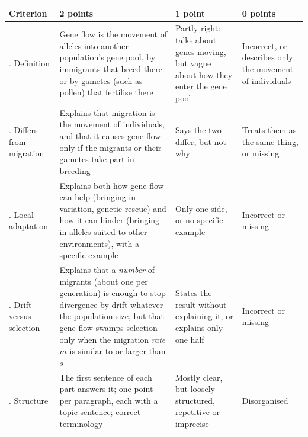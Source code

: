 \documentclass[
  a4paper]{book}
\newcounter{none} %
\begin{document}
{\def\LTcaptype{none} %
\begin{longtable}[]{@{}
  >{\raggedright\arraybackslash}p{}
  >{\raggedright\arraybackslash}p{}
  >{\raggedright\arraybackslash}p{}
  >{\raggedright\arraybackslash}p{}@{}}
\toprule\noalign{}
\begin{minipage}[b]{\linewidth}\raggedright
Criterion
\end{minipage} & \begin{minipage}[b]{\linewidth}\raggedright
2 points
\end{minipage} & \begin{minipage}[b]{\linewidth}\raggedright
1 point
\end{minipage} & \begin{minipage}[b]{\linewidth}\raggedright
0 points
\end{minipage} \\
\midrule\noalign{}
\endhead
\bottomrule\noalign{}
\endlastfoot
1. Definition & Gene flow is the movement of alleles into another population's gene pool, by immigrants that breed there or by gametes (such as pollen) that fertilise there & Partly right: talks about genes moving, but vague about how they enter the gene pool & Incorrect, or describes only the movement of individuals \\
2. Differs from migration & Explains that migration is the movement of individuals, and that it causes gene flow only if the migrants or their gametes take part in breeding & Says the two differ, but not why & Treats them as the same thing, or missing \\
3. Local adaptation & Explains both how gene flow can help (bringing in variation, genetic rescue) and how it can hinder (bringing in alleles suited to other environments), with a specific example & Only one side, or no specific example & Incorrect or missing \\
4. Drift versus selection & Explains that a \emph{number} of migrants (about one per generation) is enough to stop divergence by drift whatever the population size, but that gene flow swamps selection only when the migration \emph{rate} \(m\) is similar to or larger than \(s\) & States the result without explaining it, or explains only one half & Incorrect or missing \\
5. Structure & The first sentence of each part answers it; one point per paragraph, each with a topic sentence; correct terminology & Mostly clear, but loosely structured, repetitive or imprecise & Disorganised \\
\end{longtable}
}
\end{document}
